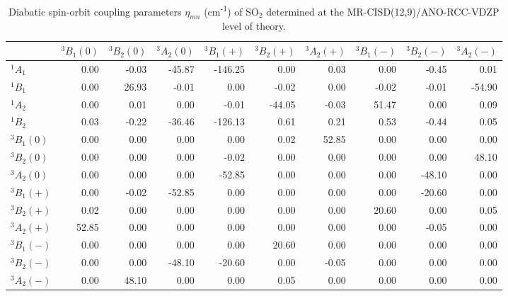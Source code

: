 \documentclass[journal=jpclcd,manuscript=article
]{achemso}
\begin{document}
 \begin{table*}[h!]
 \caption{Diabatic spin-orbit coupling parameters $\eta_{mn}$ (cm\textsuperscript{-1}) of SO$_2$ determined at the MR-CISD(12,9)/ANO-RCC-VDZP level of theory.}
 
\begin{tabular}{l||rrr|rrr|rrr}

\hline
 & $^3B_1(0)$ & $^3B_2(0)$ & $^3A_2(0)$ & $^3B_1(+)$ & $^3B_2(+)$ & $^3A_2(+)$ & $^3B_1(-)$ & $^3B_2(-)$ & $^3A_2(-)$ \\ 
\hline\hline
$^1A_1$ & 0.00 & -0.03 & -45.87 & -146.25 & 0.00 & 0.03 & 0.00 & -0.45 & 0.01 \\ 
$^1B_1$ & 0.00 & 26.93 & -0.01 & 0.00 & -0.02 & 0.00 & -0.02 & -0.01 & -54.90 \\ 
$^1A_2$ & 0.00 & 0.01 & 0.00 & -0.01 & -44.05 & -0.03 & 51.47 & 0.00 & 0.09 \\ 
$^1B_2$ & 0.03 & -0.22 & -36.46 & -126.13 & 0.61 & 0.21 & 0.53 & -0.44 & 0.05 \\ 
\hline\hline
$^3B_1(0)$ & 0.00 & 0.00 & 0.00 & 0.00 & 0.02 & 52.85 & 0.00 & 0.00 & 0.00 \\ 
$^3B_2(0)$ & 0.00 & 0.00 & 0.00 & -0.02 & 0.00 & 0.00 & 0.00 & 0.00 & 48.10 \\ 
$^3A_2(0)$ & 0.00 & 0.00 & 0.00 & -52.85 & 0.00 & 0.00 & 0.00 & -48.10 & 0.00 \\ 
\hline
$^3B_1(+)$ & 0.00 & -0.02 & -52.85 & 0.00 & 0.00 & 0.00 & 0.00 & -20.60 & 0.00 \\ 
$^3B_2(+)$ & 0.02 & 0.00 & 0.00 & 0.00 & 0.00 & 0.00 & 20.60 & 0.00 & 0.05 \\ 
$^3A_2(+)$ & 52.85 & 0.00 & 0.00 & 0.00 & 0.00 & 0.00 & 0.00 & -0.05 & 0.00 \\ 
\hline
$^3B_1(-)$ & 0.00 & 0.00 & 0.00 & 0.00 & 20.60 & 0.00 & 0.00 & 0.00 & 0.00 \\ 
$^3B_2(-)$ & 0.00 & 0.00 & -48.10 & -20.60 & 0.00 & -0.05 & 0.00 & 0.00 & 0.00 \\ 
$^3A_2(-)$ & 0.00 & 48.10 & 0.00 & 0.00 & 0.05 & 0.00 & 0.00 & 0.00 & 0.00 \\ 
\hline
\end{tabular}
\end{table*}

%
\end{document}
